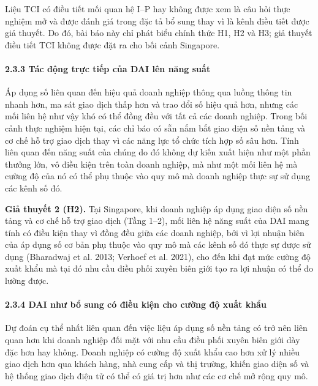 \documentclass[12pt,a4paper]{article}
\begin{document}
Liệu TCI có điều tiết mối quan hệ I--P hay không được xem là câu hỏi
thực nghiệm mở và được đánh giá trong đặc tả bổ sung thay vì là kênh
điều tiết được giả thuyết. Do đó, bài báo này chỉ phát biểu chính thức
H1, H2 và H3; giả thuyết điều tiết TCI không được đặt ra cho bối cảnh
Singapore.

\hypertarget{233-tuxe1c-ux111ux1ed9ng-trux1ef1c-tiux1ebfp-cux1ee7a-dai-luxean-nux103ng-suux1ea5t}{%
\paragraph{2.3.3 Tác động trực tiếp của DAI lên năng
suất}\label{233-tuxe1c-ux111ux1ed9ng-trux1ef1c-tiux1ebfp-cux1ee7a-dai-luxean-nux103ng-suux1ea5t}}

Áp dụng số liên quan đến hiệu quả doanh nghiệp thông qua luồng thông tin
nhanh hơn, ma sát giao dịch thấp hơn và trao đổi số hiệu quả hơn, nhưng
các mối liên hệ như vậy khó có thể đồng đều với tất cả các doanh nghiệp.
Trong bối cảnh thực nghiệm hiện tại, các chỉ báo có sẵn nắm bắt giao
diện số nền tảng và cơ chế hỗ trợ giao dịch thay vì các năng lực tổ chức
tích hợp số sâu hơn. Tính liên quan đến năng suất của chúng do đó không
dự kiến xuất hiện như một phần thưởng lớn, vô điều kiện trên toàn doanh
nghiệp, mà như một mối liên hệ mà cường độ của nó có thể phụ thuộc vào
quy mô mà doanh nghiệp thực sự sử dụng các kênh số đó.

\textbf{Giả thuyết 2 (H2).} Tại Singapore, khi doanh nghiệp áp dụng giao
diện số nền tảng và cơ chế hỗ trợ giao dịch (Tầng 1--2), mối liên hệ
năng suất của DAI mang tính có điều kiện thay vì đồng đều giữa các doanh
nghiệp, bởi vì lợi nhuận biên của áp dụng số cơ bản phụ thuộc vào quy mô
mà các kênh số đó thực sự được sử dụng (Bharadwaj et al. 2013; Verhoef
et al. 2021), cho đến khi đạt mức cường độ xuất khẩu mà tại đó nhu cầu
điều phối xuyên biên giới tạo ra lợi nhuận có thể đo lường được.

\hypertarget{234-dai-nhux1b0-bux1ed5-sung-cuxf3-ux111iux1ec1u-kiux1ec7n-cho-cux1b0ux1eddng-ux111ux1ed9-xuux1ea5t-khux1ea9u}{%
\paragraph{2.3.4 DAI như bổ sung có điều kiện cho cường độ xuất
khẩu}\label{234-dai-nhux1b0-bux1ed5-sung-cuxf3-ux111iux1ec1u-kiux1ec7n-cho-cux1b0ux1eddng-ux111ux1ed9-xuux1ea5t-khux1ea9u}}

Dự đoán cụ thể nhất liên quan đến việc liệu áp dụng số nền tảng có trở
nên liên quan hơn khi doanh nghiệp đối mặt với nhu cầu điều phối xuyên
biên giới dày đặc hơn hay không. Doanh nghiệp có cường độ xuất khẩu cao
hơn xử lý nhiều giao dịch hơn qua khách hàng, nhà cung cấp và thị
trường, khiến giao diện số và hệ thống giao dịch điện tử có thể có giá
trị hơn như các cơ chế mở rộng quy mô.
\end{document}
